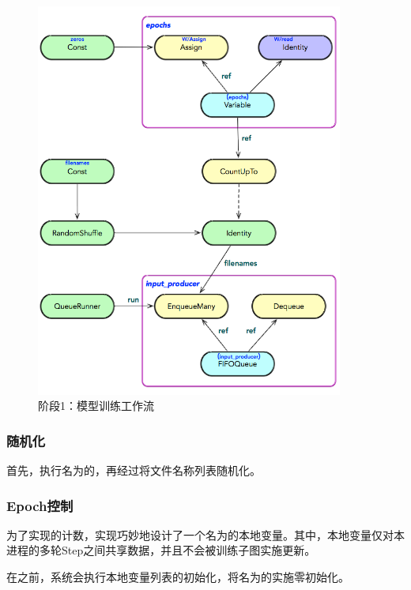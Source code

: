 \begin{content}
\begin{figure}[!htbp]
\centering
\includegraphics[width=0.9\textwidth]{figures/tf-input-pipeline-stage-1.png}
\caption{阶段1：模型训练工作流}
 \label{fig:tf-input-pipeline-stage-1}
\end{figure}

\subsubsection{随机化}

首先，执行名为的，再经过将文件名称列表随机化。

\subsubsection{Epoch控制}

为了实现的计数，实现巧妙地设计了一个名为的本地变量。其中，本地变量仅对本进程的多轮Step之间共享数据，并且不会被训练子图实施更新。

在之前，系统会执行本地变量列表的初始化，将名为的实施零初始化。


\end{content}
